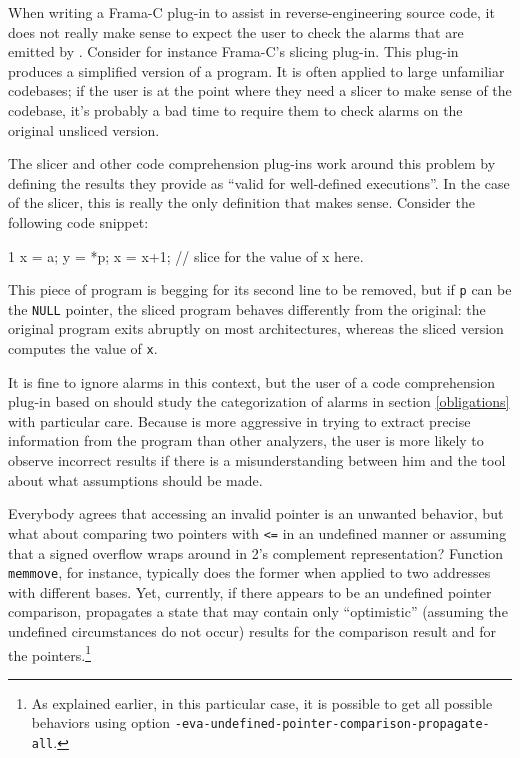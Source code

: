 \documentclass{frama-c-book}
\begin{document}
When writing a Frama-C plug-in to assist in
reverse-engineering source code, it does not really make sense to expect
the user to check the alarms that are emitted by \Eva{}.
Consider for instance Frama-C's slicing plug-in. This plug-in produces
a simplified version of a program. It is often applied to large unfamiliar
codebases; if the user is at the point where they need a slicer to make
sense of the codebase, it's probably a bad time to require
them to check alarms on the original unsliced version.

The slicer and other code comprehension plug-ins work around this problem
by defining the results they provide as ``valid for well-defined executions''.
In the case of the slicer, this is really the only definition that makes
sense. Consider the following code snippet:

\begin{listing}{1}
x = a;
y = *p;
x = x+1;
// slice for the value of x here.
\end{listing}

This piece of program is begging for its second line to be removed, but
if \lstinline|p| can be the \lstinline|NULL| pointer, the sliced
program behaves differently from the original: the original program
exits abruptly on most architectures, whereas the sliced version
computes the value of \lstinline|x|.

It is fine to ignore alarms in this context,
but the user of a code comprehension plug-in based on \Eva{}
should study the categorization of alarms in section \ref{obligations}
with particular care.
Because \Eva{} is more aggressive
in trying to extract precise information from the program than other
analyzers, the user is more likely to observe incorrect results if there
is a misunderstanding between him and the tool about what assumptions
should be made.

Everybody agrees that accessing an invalid pointer is an unwanted behavior,
but what about comparing two pointers with \lstinline|<=| in an undefined manner or
assuming that a signed overflow wraps around in 2's complement
representation? Function \lstinline|memmove|, for instance, typically does the
former when applied to two addresses with different bases.
%
Yet, currently, if there appears to be an undefined pointer comparison, \Eva{}
propagates a state that may contain only ``optimistic''
(assuming the undefined circumstances do not occur) results
for the comparison result and for the pointers.\footnote{As explained earlier, in this particular case, it is
possible to get all possible behaviors using option
\lstinline|-eva-undefined-pointer-comparison-propagate-all|.}
\end{document}
